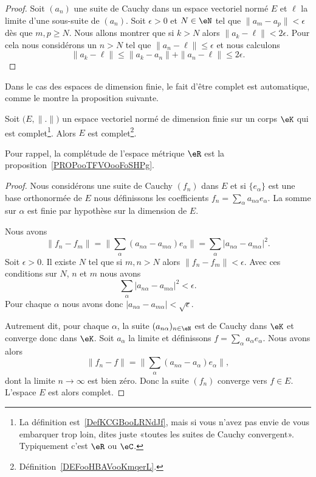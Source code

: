 \begin{proof}
	Soit \( (a_n)\) une suite de Cauchy dans un espace vectoriel normé \( E\) et \( \ell\) la limite d'une sous-suite de \( (a_n)\). Soit \( \epsilon>0\) et \( N\in \eN\) tel que \( \| a_m-a_p \|<\epsilon\) dès que \( m,p\geq N\). Nous allons montrer que si \( k>N\) alors \( \| a_k-\ell \|<2\epsilon\). Pour cela nous considérons un \( n>N\) tel que \( \| a_n-\ell \|\leq \epsilon\) et nous calculons
	\begin{equation}
		\| a_k-\ell \|\leq \| a_k-a_n \|+\| a_n-\ell \|\leq 2\epsilon.
	\end{equation}
\end{proof}

Dans le cas des espaces de dimension finie, le fait d'être complet est automatique, comme le montre la proposition suivante.
\begin{proposition}     \label{PROPooGJDTooXOoYfw}
	Soit \( \big( E,\| . \| \big)\) un espace vectoriel normé de dimension finie sur un corps \( \eK\) qui est complet\footnote{La définition est~\ref{DefKCGBooLRNdJf}, mais si vous n'avez pas envie de vous embarquer trop loin, dites juste «toutes les suites de Cauchy convergent». Typiquement c'est \( \eR\) ou \( \eC\).}. Alors \( E\) est complet\footnote{Définition~\ref{DEFooHBAVooKmqerL}.}.
\end{proposition}
Pour rappel, la complétude de l'espace métrique \( \eR\) est la proposition~\ref{PROPooTFVOooFoSHPg}.

\begin{proof}
	Nous considérons une suite de Cauchy \( (f_n)\) dans \( E\) et si \( \{ e_{\alpha} \} \) est une base orthonormée de \( E\) nous définissons les coefficients \( f_n=\sum_{\alpha}a_{n\alpha}e_{\alpha} \). La somme sur \( \alpha\) est finie par hypothèse sur la dimension de \( E\).

	Nous avons
	\begin{equation}
		\| f_n-f_m \|=\| \sum_{\alpha}(a_{n\alpha}-a_{m\alpha})e_{\alpha} \|=\sum_{\alpha}| a_{n\alpha}-a_{m\alpha} |^2.
	\end{equation}
    Soit \( \epsilon>0\). Il existe \( N\) tel que si \( m,n>N\) alors \( \| f_n-f_m \|<\epsilon\). Avec ces conditions sur \( N\), \( n\) et \( m\) nous avons
    \begin{equation}
        \sum_{\alpha}| a_{n\alpha}-a_{m\alpha} |^2<\epsilon.
    \end{equation}
    Pour chaque \( \alpha\) nous avons donc \( | a_{n\alpha}-a_{m\alpha} |<\sqrt{ \epsilon }\).

    Autrement dit, pour chaque \( \alpha\), la suite \( (a_{n\alpha})_{n\in \eN}\) est de Cauchy dans \( \eK\) et converge donc dans \( \eK\). Soit \( a_{\alpha}\) la limite et définissons \( f=\sum_{\alpha}a_{\alpha}e_{\alpha}\). Nous avons alors
	\begin{equation}
		\| f_n-f \|=\| \sum_{\alpha}(a_{n\alpha}-a_{\alpha})e_{\alpha} \|,
	\end{equation}
	dont la limite \( n\to \infty\) est bien zéro. Donc la suite \( (f_n)\) converge vers \( f\in E\). L'espace \( E\) est alors complet.
\end{proof}


